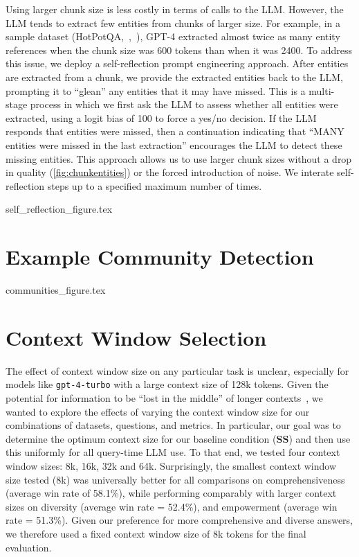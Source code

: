 Using larger chunk size is less costly in terms of calls to the LLM.
However, the LLM tends to extract few entities from chunks of larger size.
For example, in a sample dataset (HotPotQA,~\citeauthor{yang2018hotpotqa},~\citeyear{yang2018hotpotqa}), GPT-4 extracted almost twice as many entity references when the chunk size was 600 tokens than when it was 2400.
To address this issue, we deploy a self-reflection prompt engineering approach.
After entities are extracted from a chunk, we provide the extracted entities back to the LLM, prompting it to ``glean'' any entities that it may have missed.
This is a multi-stage process in which we first ask the LLM to assess whether all entities were extracted, using a logit bias of 100 to force a yes/no decision.
If the LLM responds that entities were missed, then a continuation indicating that ``MANY entities were missed in the last extraction'' encourages the LLM to detect these missing entities.
This approach allows us to use larger chunk sizes without a drop in quality (\autoref{fig:chunkentities}) or the forced introduction of noise.
We interate self-reflection steps up to a specified maximum number of times.

{self_reflection_figure.tex}

\section{Example Community Detection}
\label{app:graph}

{communities_figure.tex}

\raggedbottom

\pagebreak
\section{Context Window Selection}
\label{app:window}
The effect of context window size on any particular task is unclear, especially for models like \texttt{gpt-4-turbo} with a large context size of 128k tokens. Given the potential for information to be ``lost in the middle'' of longer contexts~\citep{liu-etal:2023:tacl, kuratov2024search}, we wanted to explore the effects of varying the context window size for our combinations of datasets, questions, and metrics. In particular, our goal was to determine the optimum context size for our baseline condition (\textbf{SS}) and then use this uniformly for all query-time LLM use. To that end, we tested four context window sizes: 8k, 16k, 32k and 64k. Surprisingly, the smallest context window size tested (8k) was universally better for all comparisons on comprehensiveness (average win rate of 58.1\%), while performing comparably with larger context sizes on diversity (average win rate = 52.4\%), and empowerment (average win rate = 51.3\%). Given our preference for more comprehensive and diverse answers, we therefore used a fixed context window size of 8k tokens for the final evaluation.

